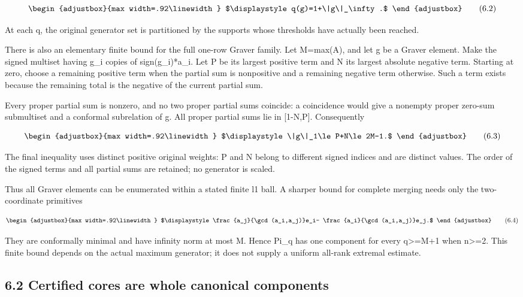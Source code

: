 \[
\begin{adjustbox}{max width=.92\linewidth}
$\displaystyle q(g)=1+\|g\|_\infty.$
\end{adjustbox}
\tag{6.2}
\]

At each q, the original generator set is partitioned by the supports whose thresholds have actually been reached.

There is also an elementary finite bound for the full one-row Graver family. Let M=max(A), and let g be a Graver element. Make the signed multiset having \textbar g\_i\textbar{} copies of sign(g\_i)*a\_i. Let P be its largest positive term and N its largest absolute negative term. Starting at zero, choose a remaining positive term when the partial sum is nonpositive and a remaining negative term otherwise. Such a term exists because the remaining total is the negative of the current partial sum.

Every proper partial sum is nonzero, and no two proper partial sums coincide: a coincidence would give a nonempty proper zero-sum submultiset and a conformal subrelation of g. All proper partial sums lie in {[}1-N,P{]}. Consequently

\[
\begin{adjustbox}{max width=.92\linewidth}
$\displaystyle \|g\|_1\le P+N\le2M-1.$
\end{adjustbox}
\tag{6.3}
\]

The final inequality uses distinct positive original weights: P and N belong to different signed indices and are distinct values. The order of the signed terms and all partial sums are retained; no generator is scaled.

Thus all Graver elements can be enumerated within a stated finite l1 ball. A sharper bound for complete merging needs only the two-coordinate primitives

\[
\begin{adjustbox}{max width=.92\linewidth}
$\displaystyle \frac{a_j}{\gcd(a_i,a_j)}e_i-
\frac{a_i}{\gcd(a_i,a_j)}e_j.$
\end{adjustbox}
\tag{6.4}
\]

They are conformally minimal and have infinity norm at most M. Hence Pi\_q has one component for every q\textgreater=M+1 when n\textgreater=2. This finite bound depends on the actual maximum generator; it does not supply a uniform all-rank extremal estimate.

\subsection{6.2 Certified cores are whole canonical components}\label{n18-certified-cores-are-whole-canonical-components}

